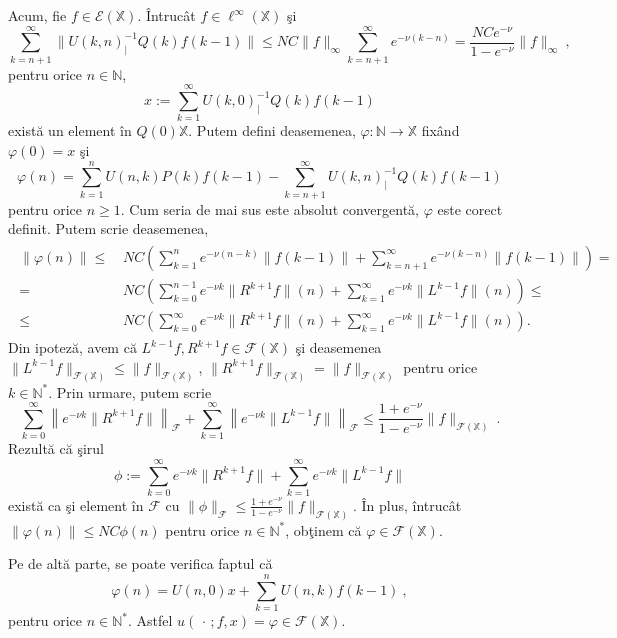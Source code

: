 \documentclass[ a4paper, 12pt]{report}
\newcommand{\E}{\mathcal{E}}
\newcommand{\F}{\mathcal{F}}
\newcommand{\N}{\mathbb{N}}
\newcommand{\X}{\mathbb{X}}
\theoremstyle{definition}
\theoremstyle{remark}
\numberwithin{equation}{section}
\begin{document}
Acum, fie $f\in\E(\X)$. \^Intruc\^at $f\in\ell^{\infty}(\X)$ \c si
$$ \sum_{k=n+1}^{\infty} \|U(k,n)_{|}^{-1}Q(k)f(k-1)\| \leq NC\|f\|_{\infty} \sum_{k=n+1}^{\infty} e^{-\nu(k-n)}=
 \frac{NCe^{-\nu}}{1-e^{-\nu}}\|f\|_{\infty}\ ,$$
pentru orice $n\in\N$,
$$ x:= \sum_{k=1}^{\infty} U(k,0)_{|}^{-1}Q(k)f(k-1)$$
exist\u a  un element \^in $Q(0)\X$.
Putem defini deasemenea, $\varphi:\N\to\X$ fix\^and $\varphi(0)=x$ \c si
\begin{equation}
\varphi(n)= \sum_{k=1}^{n} U(n,k) P(k)f(k-1) - \sum_{k=n+1}^{\infty} U(k,n)_{|}^{-1}Q(k)f(k-1)
\end{equation}
pentru orice $n\geq1$.
Cum seria de mai sus este absolut convergent\u a, $\varphi$ este corect definit.
Putem scrie deasemenea,
\begin{gather*}
\begin{split}
\|\varphi(n)\|\leq &\, NC \left(\sum_{k=1}^{n}e^{-\nu(n-k)}\|f(k-1)\|  +
   \sum_{k=n+1}^{\infty} e^{-\nu(k-n)}\|f(k-1)\| \right)=\\
   = &\, NC \left(\sum_{k=0}^{n-1}e^{-\nu k}\|R^{k+1} f\|(n)  +
   \sum_{k=1}^{\infty} e^{-\nu k}\|L^{k-1} f\|(n) \right) \leq \\
   \leq &\, NC \left(\sum_{k=0}^{\infty} e^{-\nu k}\|R^{k+1} f\|(n)  +
   \sum_{k=1}^{\infty} e^{-\nu k}\|L^{k-1} f\|(n) \right).
\end{split}
\end{gather*}
Din ipotez\u a, avem c\u a $L^{k-1} f, R^{k+1} f\in\F(\X)$ \c si deasemenea
$\|L^{k-1}f\|_{\F(\X)}\leq \|f\|_{\F(\X)}$, $\|R^{k+1}f\|_{\F(\X)}= \|f\|_{\F(\X)}$ pentru orice $k\in\N^*$.
Prin urmare, putem scrie
$$\sum_{k=0}^{\infty}\left\| e^{-\nu k}\|R^{k+1} f\|\right\|_{\F}  +
   \sum_{k=1}^{\infty} \left\|e^{-\nu k}\|L^{k-1} f\|\right\|_{\F} \leq \frac{1+e^{-\nu}}{1-e^{-\nu}}\|f\|_{\F(\X)}\ .$$
Rezult\u a c\u a \c sirul
$$\phi:= \sum_{k=0}^{\infty} e^{-\nu k}\|R^{k+1} f\| +\sum_{k=1}^{\infty} e^{-\nu k}\|L^{k-1} f\| $$
exist\u a ca \c si element \^in $\F$ cu $\|\phi\|_{\F}\leq \frac{1+e^{-\nu}}{1-e^{-\nu}}\|f\|_{\F(\X)}$.
\^In plus, \^intruc\^at
$\|\varphi(n)\|\leq NC\phi(n)$ pentru orice $n\in\N^*$, ob\c tinem c\u a $\varphi\in\F(\X)$.

Pe de alt\u a parte, se poate verifica faptul c\u a
$$\varphi(n) = U(n,0)x + \sum_{k=1}^{n}U(n,k)f(k-1)\ ,$$
pentru orice $n\in\N^*$. Astfel $u(\,\cdot\,;f,x)=\varphi\in\F(\X)$.
\end{document}
